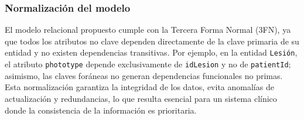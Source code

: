 \subsubsection{Normalización del modelo}
El modelo relacional propuesto cumple con la Tercera Forma Normal (3FN), ya que todos los atributos no clave dependen directamente de la clave primaria de su entidad y no existen dependencias transitivas. Por ejemplo, en la entidad \texttt{Lesión}, el atributo \texttt{phototype} depende exclusivamente de \texttt{idLesion} y no de \texttt{patientId}; asimismo, las claves foráneas no generan dependencias funcionales no primas. Esta normalización garantiza la integridad de los datos, evita anomalías de actualización y redundancias, lo que resulta esencial para un sistema clínico donde la consistencia de la información es prioritaria.